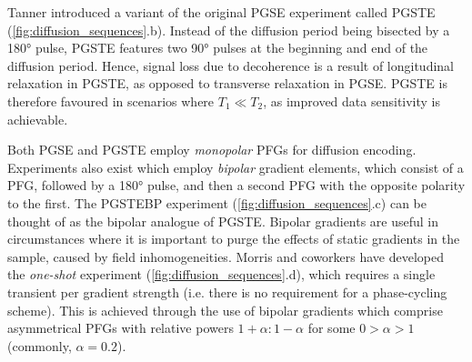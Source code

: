Tanner introduced a variant of the original \ac{PGSE} experiment called
\ac{PGSTE}\cite{Tanner1970} (\cref{fig:diffusion_sequences}.b). Instead
of the diffusion period being bisected by a
\ang{180} pulse, \ac{PGSTE} features two \ang{90} pulses at the beginning and
end of the diffusion period.
Hence, signal loss due to decoherence is
a result of longitudinal relaxation in \ac{PGSTE}, as opposed to transverse
relaxation in \ac{PGSE}. \ac{PGSTE} is therefore favoured in scenarios where
$T_1 \ll T_2$, as improved data sensitivity is achievable.

Both \ac{PGSE} and \ac{PGSTE} employ \emph{monopolar} \acp{PFG} for diffusion
encoding.
Experiments also exist which employ
\emph{bipolar} gradient elements, which consist of a
\ac{PFG}, followed by a \ang{180} pulse, and then a second \ac{PFG} with the
opposite polarity to the first\cite{Cotts1989,Wu1995}. The \ac{PGSTEBP} experiment
(\cref{fig:diffusion_sequences}.c) can be thought of as the bipolar analogue of
\ac{PGSTE}.
Bipolar gradients are useful in circumstances where it is important to purge
the effects of static gradients in the sample, caused by field inhomogeneities.
Morris and coworkers have developed the \emph{one-shot}
experiment\cite{Pelta2002} (\cref{fig:diffusion_sequences}.d), which requires a
single transient per gradient strength (i.e. there is no requirement for a
phase-cycling scheme).  This is achieved through the use of bipolar gradients
which comprise asymmetrical \acp{PFG} with relative powers $1 + \alpha : 1 -
\alpha$ for some $ 0 > \alpha > 1$ (commonly, $\alpha=0.2$).

